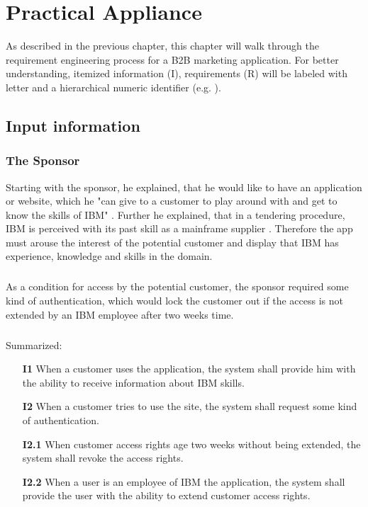 \chapter{Practical Appliance}
As described in the previous chapter, this chapter will walk through the requirement engineering process for a B2B marketing application. For better understanding, itemized information (I), requirements (R) will be labeled with letter and a hierarchical numeric identifier (e.g. ).
\section{Input information}
\subsection{The Sponsor}
Starting with the sponsor, he explained, that he would like to have an application or website, which he "can give to a customer to play around with and get to know the skills of IBM" \parencite{Sachs.20.04.2017b}. Further he explained, that in a tendering procedure, IBM is perceived with its past skill as a mainframe supplier \parencite{Sachs.20.04.2017b}. Therefore the app must arouse the interest of the potential customer and display that IBM has experience, knowledge and skills in the domain. 

\paragraph{} As a condition for access by the potential customer, the sponsor required some kind of authentication, which would lock the customer out if the access is not extended by an IBM employee after two weeks time.

\paragraph{} Summarized:

\begin{itemize}
    \item [\textbf{I1}] When a customer uses the application, the system shall provide him with the ability to receive information about IBM skills.
    \item [\textbf{I2}] When a customer tries to use the site, the system shall request some kind of authentication.
    \item [\textbf{I2.1}] When customer access rights age two weeks without being extended, the system shall revoke the access rights.
    \item [\textbf{I2.2}\label{R2.2}] When a user is an employee of IBM the application, the system shall provide the user with the ability to extend customer access rights.
\end{itemize}

